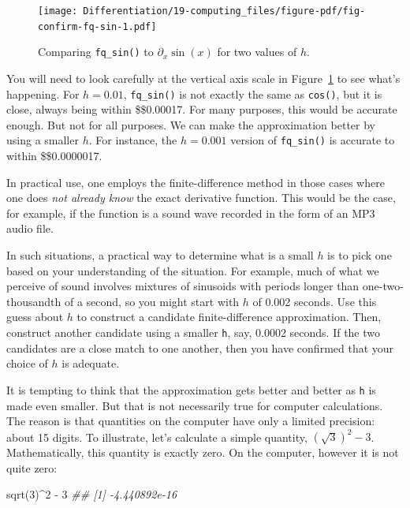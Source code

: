 \documentclass[
  letterpaper,
  DIV=11,
  numbers=noendperiod,
  oneside]{scrreprt}
\newenvironment{Shaded}{\begin{snugshade}}{\end{snugshade}}
\newcommand{\DecValTok}[1]{\textcolor[rgb]{0.68,0.00,0.00}{#1}}
\newcommand{\DocumentationTok}[1]{\textcolor[rgb]{0.37,0.37,0.37}{\textit{#1}}}
\newcommand{\FunctionTok}[1]{\textcolor[rgb]{0.28,0.35,0.67}{#1}}
\newcommand{\NormalTok}[1]{\textcolor[rgb]{0.00,0.46,0.62}{#1}}
\newcommand{\SpecialCharTok}[1]{\textcolor[rgb]{0.37,0.37,0.37}{#1}}
\begin{document}
\begin{figure}[H]

{\centering \texttt{[image: Differentiation/19-computing\_files/figure-pdf/fig-confirm-fq-sin-1.pdf]}

}

\caption{\label{fig-confirm-fq-sin}Comparing \texttt{fq\_sin()} to
\(\partial_x \sin(x)\) for two values of \(h\).}

\end{figure}

You will need to look carefully at the vertical axis scale in
Figure~\ref{fig-confirm-fq-sin} to see what's happening. For \(h=0.01\),
\texttt{fq\_sin()} is not exactly the same as \texttt{cos()}, but it is
close, always being within \$\pm\$0.00017. For many purposes, this would
be accurate enough. But not for all purposes. We can make the
approximation better by using a smaller \(h\). For instance, the
\(h=0.001\) version of \texttt{fq\_sin()} is accurate to within
\$\pm\$0.0000017.

In practical use, one employs the finite-difference method in those
cases where one does \emph{not already know} the exact derivative
function. This would be the case, for example, if the function is a
sound wave recorded in the form of an MP3 audio file.

In such situations, a practical way to determine what is a small \(h\)
is to pick one based on your understanding of the situation. For
example, much of what we perceive of sound involves mixtures of
sinusoids with periods longer than one-two-thousandth of a second, so
you might start with \(h\) of 0.002 seconds. Use this guess about \(h\)
to construct a candidate finite-difference approximation. Then,
construct another candidate using a smaller \texttt{h}, say, 0.0002
seconds. If the two candidates are a close match to one another, then
you have confirmed that your choice of \(h\) is adequate.

It is tempting to think that the approximation gets better and better as
\texttt{h} is made even smaller. But that is not necessarily true for
computer calculations. The reason is that quantities on the computer
have only a limited precision: about 15 digits. To illustrate, let's
calculate a simple quantity, \((\sqrt{3})^2 - 3\). Mathematically, this
quantity is exactly zero. On the computer, however it is not quite zero:

\begin{Shaded}
\begin{Highlighting}[]
\FunctionTok{sqrt}\NormalTok{(}\DecValTok{3}\NormalTok{)}\SpecialCharTok{\^{}}\DecValTok{2} \SpecialCharTok{{-}} \DecValTok{3}
\DocumentationTok{\#\# [1] {-}4.440892e{-}16}
\end{Highlighting}
\end{Shaded}
\end{document}
